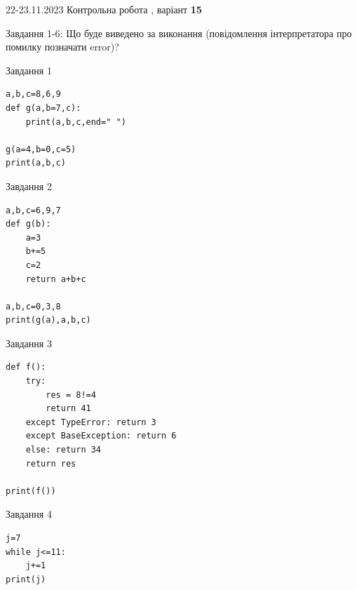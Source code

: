 \documentclass[12pt, ukrainian]{article}
\begin{document}
{{22-23.11.2023 Контрольна робота , варіант  \No \textbf { 15 }\par}}
{

Завдання 1-6: Що буде виведено за виконання (повідомлення інтерпретатора про помилку позначати error)?


\begin{minipage}[t]{9.7cm}                
{\begin{center}Завдання {1}\end{center}}
\begin{verbatim}
a,b,c=8,6,9
def g(a,b=7,c):
    print(a,b,c,end=" ")

g(a=4,b=0,c=5)
print(a,b,c)
\end{verbatim}     
\end{minipage}
\vline \hspace{8mm}
\begin{minipage}[t]{8.0cm}                
{\begin{center}Завдання {2}\end{center}}
\begin{verbatim}
a,b,c=6,9,7
def g(b):
    a=3
    b+=5
    c=2
    return a+b+c

a,b,c=0,3,8
print(g(a),a,b,c)
\end{verbatim}     
\end{minipage}

\vspace{15mm}
\begin{minipage}[t]{9.7cm}                
{\begin{center}Завдання {3}\end{center}}
\begin{verbatim}
def f():
    try:
        res = 8!=4
        return 41
    except TypeError: return 3
    except BaseException: return 6
    else: return 34
    return res

print(f())
\end{verbatim}     
\end{minipage}
\vline \hspace{8mm}
\begin{minipage}[t]{8.0cm}                
{\begin{center}Завдання {4}\end{center}}
\begin{verbatim}
j=7
while j<=11:
    j+=1
print(j)
\end{verbatim}     
\end{minipage}

}
\end{document}
